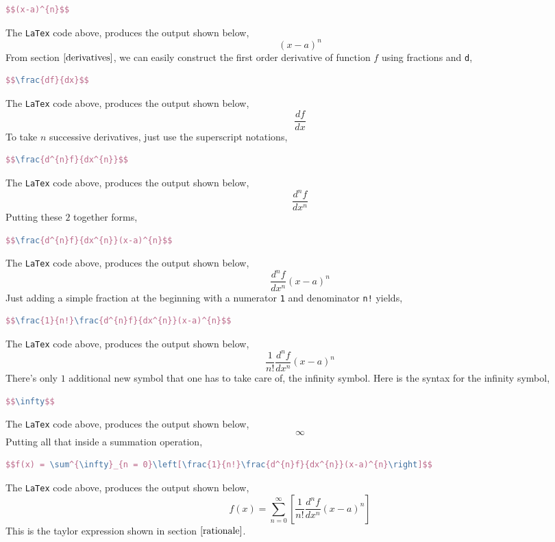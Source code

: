 \documentclass[a4paper, 12pt]{report}
\begin{document}
\begin{center}
\begin{lstlisting}[language=tex]
$$(x-a)^{n}$$
\end{lstlisting}
The \texttt{LaTex} code above, produces the output shown below,
$$(x-a)^{n}$$
From section $\ref{derivatives}$, we can easily construct the first order derivative of function $f$ using fractions and \texttt{d},
\begin{lstlisting}[language=tex]
$$\frac{df}{dx}$$
\end{lstlisting}
The \texttt{LaTex} code above, produces the output shown below,
$$\frac{df}{dx}$$
To take $n$ successive derivatives, just use the superscript notations, 
\begin{lstlisting}[language=tex]
$$\frac{d^{n}f}{dx^{n}}$$
\end{lstlisting}
The \texttt{LaTex} code above, produces the output shown below,
$$\frac{d^{n}f}{dx^{n}}$$
Putting these $2$ together forms,
\begin{lstlisting}[language=tex]
$$\frac{d^{n}f}{dx^{n}}(x-a)^{n}$$
\end{lstlisting}
The \texttt{LaTex} code above, produces the output shown below,
$$\frac{d^{n}f}{dx^{n}}(x-a)^{n}$$
Just adding a simple fraction at the beginning with a numerator \texttt{1} and denominator \texttt{n!} yields,
\begin{lstlisting}[language=tex]
$$\frac{1}{n!}\frac{d^{n}f}{dx^{n}}(x-a)^{n}$$
\end{lstlisting}
The \texttt{LaTex} code above, produces the output shown below,
$$\frac{1}{n!}\frac{d^{n}f}{dx^{n}}(x-a)^{n}$$
There's only $1$ additional new symbol that one has to take care of, the infinity symbol. Here is the syntax for the infinity symbol,
\begin{lstlisting}[language=tex]
$$\infty$$
\end{lstlisting}
The \texttt{LaTex} code above, produces the output shown below,
$$\infty$$
Putting all that inside a summation operation,
\begin{lstlisting}[language=tex]
$$f(x) = \sum^{\infty}_{n = 0}\left[\frac{1}{n!}\frac{d^{n}f}{dx^{n}}(x-a)^{n}\right]$$
\end{lstlisting}
The \texttt{LaTex} code above, produces the output shown below,
$$f(x) = \sum^{\infty}_{n = 0}\left[\frac{1}{n!}\frac{d^{n}f}{dx^{n}}(x-a)^{n}\right]$$
This is the taylor expression shown in section $\ref{rationale}$. 


\end{center}
\end{document}
